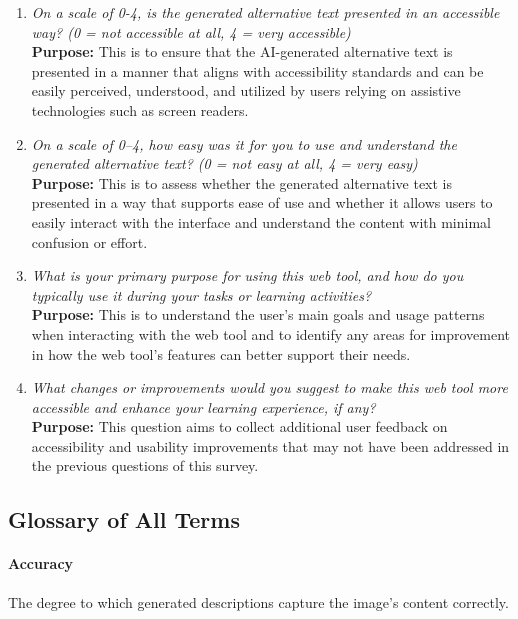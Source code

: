 \documentclass[12pt, titlepage]{article}
\begin{document}
\begin{enumerate}[label=UA-Q \arabic*., wide=0pt, leftmargin=*]
  \item \emph{On a scale of 0-4, is the generated alternative text
      presented in an accessible way? (0 = not accessible at all, 4 =
    very accessible)}\\[2mm]
    {\bf Purpose:} This is to ensure that the AI-generated alternative
    text is presented in a manner that aligns with accessibility standards and
    can be easily perceived, understood, and utilized by users relying
    on assistive technologies such as screen readers.

  \item \emph{On a scale of 0–4, how easy was it for you to use and
      understand the generated alternative text? (0 = not easy at all, 4
    = very easy)}\\[2mm]
    {\bf Purpose:} This is to assess whether the generated alternative
    text is presented in a way that supports ease of use and whether it
    allows users to easily interact with
    the interface and understand the content with minimal confusion or effort.

  \item \emph{What is your primary purpose for using this web tool, and
      how do you typically use it during your tasks or learning
    activities?}\\[2mm]
    {\bf Purpose:} This is to understand the user’s main goals and
    usage patterns when interacting with the web tool and to identify
    any areas for improvement in how the web tool's features
    can better support their needs.

  \item \emph{What changes or improvements would you suggest to make
      this web tool more accessible and enhance your learning experience,
    if any?}\\[2mm]
    {\bf Purpose:} This question aims to collect additional user
    feedback on accessibility and usability improvements that may not
    have been addressed in the previous questions of this survey.
\end{enumerate}

\subsection{Glossary of All Terms}

\paragraph*{Accuracy}
The degree to which generated descriptions capture the image’s
content correctly.
\end{document}

